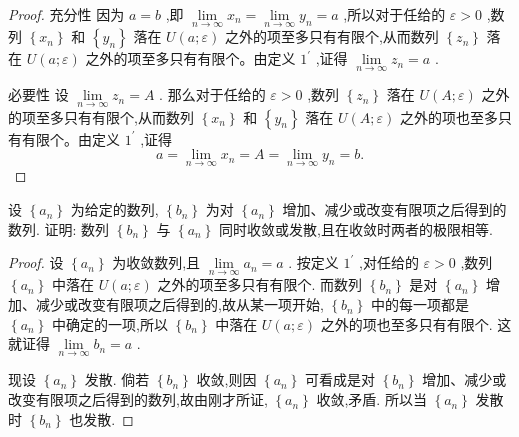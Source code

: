 \begin{proof}
充分性 因为 \(a = b\) ,即 \(\mathop{\lim }\limits_{{n \rightarrow  \infty }}{x}_{n} = \mathop{\lim }\limits_{{n \rightarrow  \infty }}{y}_{n} = a\) ,所以对于任给的 \(\varepsilon  > 0\) ,数列 \(\left\{  {x}_{n}\right\}\) 和 \(\left\{  {y}_{n}\right\}\) 落在 \(U\left( {a;\varepsilon }\right)\) 之外的项至多只有有限个,从而数列 \(\left\{  {z}_{n}\right\}\) 落在 \(U\left( {a;\varepsilon }\right)\) 之外的项至多只有有限个。由定义 \({1}^{\prime }\) ,证得 \(\mathop{\lim }\limits_{{n \rightarrow  \infty }}{z}_{n} = a\) .

必要性 设 \(\mathop{\lim }\limits_{{n \rightarrow  \infty }}{z}_{n} = A\) . 那么对于任给的 \(\varepsilon  > 0\) ,数列 \(\left\{  {z}_{n}\right\}\) 落在 \(U\left( {A;\varepsilon }\right)\) 之外的项至多只有有限个,从而数列 \(\left\{  {x}_{n}\right\}\) 和 \(\left\{  {y}_{n}\right\}\) 落在 \(U\left( {A;\varepsilon }\right)\) 之外的项也至多只有有限个。由定义 \({1}^{\prime }\) ,证得
\[
a = \mathop{\lim }\limits_{{n \rightarrow  \infty }}{x}_{n} = A = \mathop{\lim }\limits_{{n \rightarrow  \infty }}{y}_{n} = b.
\]
\end{proof}


\begin{example}
设 \(\left\{  {a}_{n}\right\}\) 为给定的数列, \(\left\{  {b}_{n}\right\}\) 为对 \(\left\{  {a}_{n}\right\}\) 增加、减少或改变有限项之后得到的数列. 证明: 数列 \(\left\{  {b}_{n}\right\}\) 与 \(\left\{  {a}_{n}\right\}\) 同时收敛或发散,且在收敛时两者的极限相等.
\end{example}


\begin{proof}
设 \(\left\{  {a}_{n}\right\}\) 为收敛数列,且 \(\mathop{\lim }\limits_{{n \rightarrow  \infty }}{a}_{n} = a\) . 按定义 \({1}^{\prime }\) ,对任给的 \(\varepsilon  > 0\) ,数列 \(\left\{  {a}_{n}\right\}\) 中落在 \(U\left( {a;\varepsilon }\right)\) 之外的项至多只有有限个. 而数列 \(\left\{  {b}_{n}\right\}\) 是对 \(\left\{  {a}_{n}\right\}\) 增加、减少或改变有限项之后得到的,故从某一项开始, \(\left\{  {b}_{n}\right\}\) 中的每一项都是 \(\left\{  {a}_{n}\right\}\) 中确定的一项,所以 \(\left\{  {b}_{n}\right\}\) 中落在 \(U\left( {a;\varepsilon }\right)\) 之外的项也至多只有有限个. 这就证得 \(\mathop{\lim }\limits_{{n \rightarrow  \infty }}{b}_{n} = a\) .

现设 \(\left\{  {a}_{n}\right\}\) 发散. 倘若 \(\left\{  {b}_{n}\right\}\) 收敛,则因 \(\left\{  {a}_{n}\right\}\) 可看成是对 \(\left\{  {b}_{n}\right\}\) 增加、减少或改变有限项之后得到的数列,故由刚才所证, \(\left\{  {a}_{n}\right\}\) 收敛,矛盾. 所以当 \(\left\{  {a}_{n}\right\}\) 发散时 \(\left\{  {b}_{n}\right\}\) 也发散.
\end{proof}


